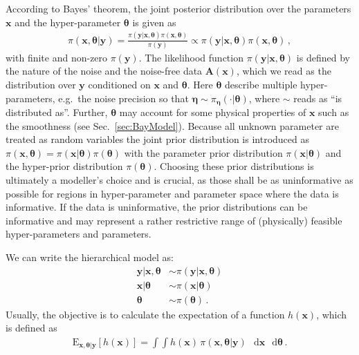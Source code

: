 \documentclass{article}
\newcommand{\diff}{\mathop{}\!\mathrm{d}}
\begin{document}
According to Bayes' theorem, the joint posterior distribution over the parameters $\bm{x}$ and the hyper-parameter $\bm{\theta}$ is given as
\begin{align}
	\pi(\bm{x},\bm{\theta}|\bm{y}) = \frac{ \pi(\bm{y} | \bm{x}, \bm{\theta} ) \pi(\bm{x}, \bm{\theta})}{\pi(\bm{y})} \propto \pi(\bm{y} | \bm{x}, \bm{\theta} ) \pi(\bm{x}, \bm{\theta}) \, ,
\end{align}
with finite and non-zero $\pi(\bm{y})$.
The likelihood function $\pi(\bm{y}|\bm{x},\bm{\theta})$ is defined by the nature of the noise and the noise-free data $\bm{A}(\bm{x})$, which we read as the distribution over $\bm{y}$ conditioned on $\bm{x}$ and $\bm{\theta}$.
Here $\bm{\theta}$ describe multiple hyper-parameters, e.g.~the noise precision so that $\bm{\eta} \sim \pi_{\bm{\eta}}(\cdot|\bm{\theta})$, where $\sim$ reads as ``is distributed as''.
Further, $\bm{\theta}$ may account for some physical properties of $\bm{x}$ such as the smoothness (see Sec.~\ref{sec:BayModel}).
Because all unknown parameter are treated as random variables the joint prior distribution is introduced as $\pi(\bm{x}, \bm{\theta}) = \pi(\bm{x}|\bm{\theta}) \pi(\bm{\theta})$ with the parameter prior distribution $\pi(\bm{x}|\bm{\theta})$ and the hyper-prior distribution $\pi(\bm{\theta})$.
Choosing these prior distributions is ultimately a modeller's choice and is crucial, as those shall be as uninformative as possible for regions in hyper-parameter and parameter space where the data is informative.
If the data is uninformative, the prior distributions can be informative and may represent a rather restrictive range of (physically) feasible hyper-parameters and parameters.

We can write the hierarchical model as:
\begin{subequations}
	\begin{align}
		\bm{y} |  \bm{x},\bm{\theta}  &\sim \pi(\bm{y} | \bm{x}, \bm{\theta} ) \\
		\bm{x}| \bm{\theta}   &\sim \pi(\bm{x}|\bm{\theta})   \\
		\bm{\theta}   &\sim \pi(\bm{\theta} ) \, .
	\end{align} 
\end{subequations}
Usually, the objective is to calculate the expectation of a function $h(\bm{x})$, which is defined as
\begin{align}
	\text{E}_{\bm{x},\bm{\theta}|\bm{y}} [h(\bm{x})] =  \int \int   h(\bm{x}) \,  \pi(\bm{x}, \bm{\theta} | \bm{y} ) \, \diff \bm{x}  \, \diff \bm{\theta}  \label{eq:expPos} \, .
\end{align}
\end{document}
